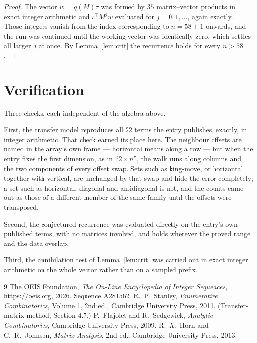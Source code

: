 \documentclass[11pt,a4paper]{article}
\theoremstyle{plain}
\theoremstyle{definition}
\begin{document}
\begin{proof}
The vector $w=q(M)\tau$ was formed by $35$ matrix--vector products in exact integer
arithmetic and $\iota^{\!\top}M^{j}w$ evaluated for $j=0,1,\dots$, again exactly. Those
integers vanish from the index corresponding to $n=58+1$ onwards, and the run was
continued until the working vector was identically zero, which settles all larger $j$ at once.
By Lemma~\ref{lem:crit} the recurrence holds for every $n>58$.
\end{proof}

\section{Verification}

Three checks, each independent of the algebra above.

First, the transfer model reproduces all $22$ terms the entry publishes, exactly, in
integer arithmetic. That check earned its place here. The neighbour offsets are named in the
array's own frame --- horizontal means along a row --- but when the entry fixes the first
dimension, as in ``$2\times n$'', the walk runs along columns and the two components of every
offset swap. Sets such as king-move, or horizontal together with vertical, are unchanged by
that swap and hide the error completely; a set such as horizontal, diagonal and antidiagonal
is not, and the counts came out as those of a different member of the same family until the
offsets were transposed.

Second, the conjectured recurrence was evaluated directly on the entry's own published terms,
with no matrices involved, and holds wherever the proved range and the data overlap.

Third, the annihilation test of Lemma~\ref{lem:crit} was carried out in exact integer
arithmetic on the whole vector rather than on a sampled prefix.

\begin{thebibliography}{9}
 The OEIS Foundation, \emph{The On-Line Encyclopedia of Integer
Sequences}, \url{https://oeis.org}, 2026. Sequence A281562.
 R.~P.~Stanley, \emph{Enumerative Combinatorics}, Volume 1, 2nd ed.,
Cambridge University Press, 2011. (Transfer-matrix method, Section 4.7.)
 P.~Flajolet and R.~Sedgewick, \emph{Analytic Combinatorics}, Cambridge
University Press, 2009.
 R.~A.~Horn and C.~R.~Johnson, \emph{Matrix Analysis}, 2nd ed., Cambridge
University Press, 2013.
\end{thebibliography}
\end{document}
